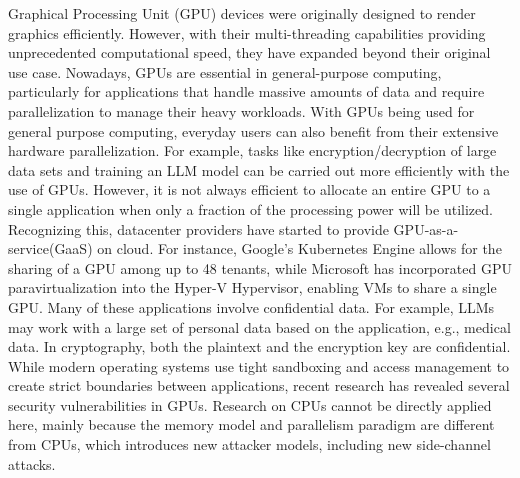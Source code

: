   Graphical Processing Unit (GPU) devices were originally designed to render graphics efficiently.
%
However, with their multi-threading capabilities providing unprecedented computational speed, they have expanded beyond their original use case.
%
Nowadays, GPUs are essential in general-purpose computing, particularly for applications that handle massive amounts of data and require parallelization to manage their heavy workloads.
%
%
With GPUs being used for general purpose computing, everyday users can also benefit from their extensive hardware parallelization.
%
For example, tasks like encryption/decryption of large data sets and training an LLM model can be carried out more efficiently with the use of GPUs.
%
However, it is not always efficient to allocate an entire GPU to a single application when only a fraction of the processing power will be utilized.
%
Recognizing this, datacenter providers have started to provide GPU-as-a-service(GaaS) on cloud.
%
For instance, Google's Kubernetes Engine allows for the sharing of a GPU among up to 48 tenants, while Microsoft has incorporated GPU paravirtualization into the Hyper-V Hypervisor, enabling VMs to share a single GPU.
Many of these applications involve confidential data. 
%
For example, LLMs may work with a large set of personal data based on the application, e.g., medical data.
%
In cryptography, both the plaintext and the encryption key are confidential.
%
While modern operating systems use tight sandboxing and access management to create strict boundaries between applications, recent research has revealed several security vulnerabilities in GPUs.
%
Research on CPUs cannot be directly applied here, mainly because the memory model and parallelism paradigm are different from CPUs, which introduces new attacker models, including new side-channel attacks.


